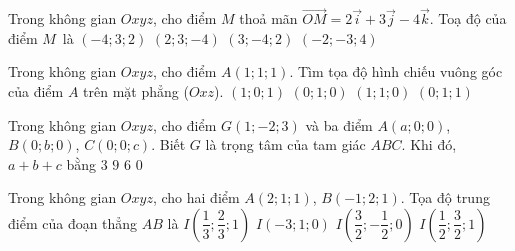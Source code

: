 \begin{ex}%
	Trong không gian $Oxyz$, cho điểm $M$ thoả mãn $\overrightarrow{OM}=2 \overrightarrow{i}+3\overrightarrow{j}-4\overrightarrow{k}$. Toạ độ của  điểm $M$~là
	 \choice
		{$(-4;3;2)$} 
		 {\True $(2;3;-4)$}
		 {$(3;-4;2)$}
		{$(-2;-3;4)$} 
\end{ex}

\begin{ex}%
	Trong không gian  $Oxyz$, cho điểm $A(1;1;1)$. Tìm tọa độ hình chiếu vuông góc của điểm $A$ trên mặt phẳng ($Oxz$).
	\choice 
		{\True  $(1;0;1)$}
		 {$(0;1;0)$}
		 {$(1;1;0)$}
		{$(0;1;1)$} 
\end{ex}

\begin{ex}%
	Trong  không gian $Oxyz$, cho điểm $G(1;-2;3)$ và ba điểm $A(a;0;0)$, $B(0;b;0)$, $C(0;0;c)$. Biết $G$ là trọng tâm của tam giác $ABC$. Khi đó, $a+b+c$ bằng
	\choice 
		 {$3$}
		{$9$} 
		{\True  $6$}
		 {$0$}
\end{ex}

\begin{ex}%
	Trong không gian $Oxyz$,  cho hai điểm $A(2;1;1)$, $B(-1;2;1)$. Tọa độ trung điểm của đoạn thẳng $AB$ là
	 \choice
		{$I\left(\dfrac{1}{3};\dfrac{2}{3};1\right)$} 
		{$I(-3;1;0)$} 
		{$I\left(\dfrac{3}{2};-\dfrac{1}{2};0\right)$} 
		{\True $I\left(\dfrac{1}{2};\dfrac{3}{2};1\right)$} 
\end{ex}

